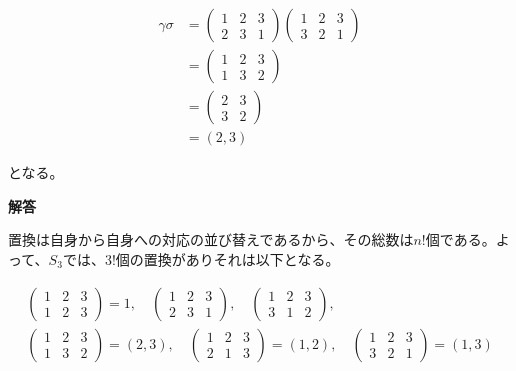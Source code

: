 \documentclass[dvipdfmx,autodetect-engine]{jsarticle}
\begin{document}
\begin{equation*}
\begin{split}
\gamma\sigma &= \begin{pmatrix}
1 & 2 & 3 \\
2 & 3 & 1
\end{pmatrix} \begin{pmatrix}
1 & 2 & 3 \\
3 & 2 & 1
\end{pmatrix}\\[1ex]
&= \begin{pmatrix}
1 & 2 & 3 \\
1 & 3 & 2
\end{pmatrix}\\[1ex]
&= \begin{pmatrix}
2 & 3 \\
3 & 2
\end{pmatrix}\\[1ex]
&= (2, 3)
\end{split}
\end{equation*}

となる。

\label{exercise:permutation1}

{\bf 解答}

置換は自身から自身への対応の並び替えであるから、その総数は$n!$個である。よって、$S_3$では、$3!$個の置換がありそれは以下となる。

\begin{eqnarray*}
\begin{pmatrix}
1 & 2 & 3 \\
1 & 2 & 3
\end{pmatrix} = 1, \quad \begin{pmatrix}
1 & 2 & 3 \\
2 & 3 & 1
\end{pmatrix}, \quad \begin{pmatrix}
1 & 2 & 3 \\
3 & 1 & 2
\end{pmatrix}, \\[1.5ex]
\begin{pmatrix}
1 & 2 & 3 \\
1 & 3 & 2
\end{pmatrix} = (2, 3), \quad 
\begin{pmatrix}
1 & 2 & 3 \\
2 & 1 & 3
\end{pmatrix} = (1, 2), \quad 
\begin{pmatrix}
1 & 2 & 3 \\
3 & 2 & 1
\end{pmatrix} = (1, 3)
\end{eqnarray*}
\end{document}
